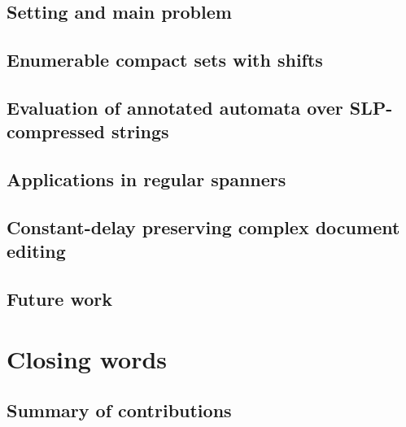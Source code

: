 \documentclass[pdftex]{pucthesis}	%
\begin{document}


\section{Setting and main problem}\label{slps:sec:setting}



\section{Enumerable compact sets with shifts}\label{slps:sec:ecs}

%

\section{Evaluation of annotated automata over SLP-compressed strings}\label{slps:sec:evaluation}

%

\section{Applications in regular spanners}\label{slps:sec:spanners}

%

\section{Constant-delay preserving complex document editing}\label{slps:sec:edits}

%

\section{Future work}\label{slps:sec:conclusions}

%


\chapter[CLOSING WORDS]{Closing words}

\section{Summary of contributions}
\end{document}
